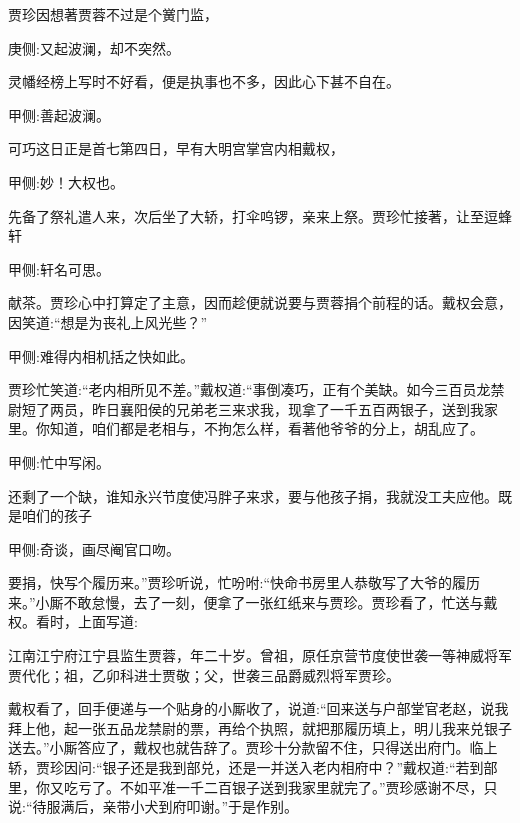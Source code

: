 \begin{parag}
    贾珍因想著贾蓉不过是个黉门监，\begin{note}庚侧:又起波澜，却不突然。\end{note}灵幡经榜上写时不好看，便是执事也不多，因此心下甚不自在。\begin{note}甲侧:善起波澜。\end{note}可巧这日正是首七第四日，早有大明宫掌宫内相戴权，\begin{note}甲侧:妙！大权也。\end{note}先备了祭礼遣人来，次后坐了大轿，打伞呜锣，亲来上祭。贾珍忙接著，让至逗蜂轩\begin{note}甲侧:轩名可思。\end{note}献茶。贾珍心中打算定了主意，因而趁便就说要与贾蓉捐个前程的话。戴权会意，因笑道:“想是为丧礼上风光些？”\begin{note}甲侧:难得内相机括之快如此。\end{note}贾珍忙笑道:“老内相所见不差。”戴权道:“事倒凑巧，正有个美缺。如今三百员龙禁尉短了两员，昨日襄阳侯的兄弟老三来求我，现拿了一千五百两银子，送到我家里。你知道，咱们都是老相与，不拘怎么样，看著他爷爷的分上，胡乱应了。\begin{note}甲侧:忙中写闲。\end{note}还剩了一个缺，谁知永兴节度使冯胖子来求，要与他孩子捐，我就没工夫应他。既是咱们的孩子\begin{note}甲侧:奇谈，画尽阉官口吻。\end{note}要捐，快写个履历来。”贾珍听说，忙吩咐:“快命书房里人恭敬写了大爷的履历来。”小厮不敢怠慢，去了一刻，便拿了一张红纸来与贾珍。贾珍看了，忙送与戴权。看时，上面写道:
\end{parag}


\begin{qute2sp}
    江南江宁府江宁县监生贾蓉，年二十岁。曾祖，原任京营节度使世袭一等神威将军贾代化；祖，乙卯科进士贾敬；父，世袭三品爵威烈将军贾珍。
\end{qute2sp}


\begin{parag}
    戴权看了，回手便递与一个贴身的小厮收了，说道:“回来送与户部堂官老赵，说我拜上他，起一张五品龙禁尉的票，再给个执照，就把那履历填上，明儿我来兑银子送去。”小厮答应了，戴权也就告辞了。贾珍十分款留不住，只得送出府门。临上轿，贾珍因问:“银子还是我到部兑，还是一并送入老内相府中？”戴权道:“若到部里，你又吃亏了。不如平准一千二百银子送到我家里就完了。”贾珍感谢不尽，只说:“待服满后，亲带小犬到府叩谢。”于是作别。
\end{parag}


